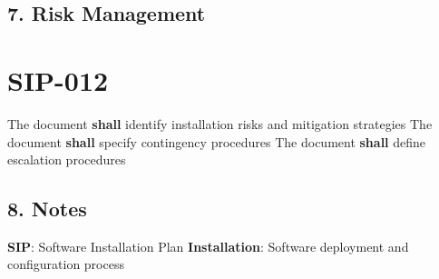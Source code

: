 \subsection{7. Risk Management}

\section{SIP-012}\label{SIP-012}

The document \textbf{shall} identify installation risks and mitigation strategies
The document \textbf{shall} specify contingency procedures
The document \textbf{shall} define escalation procedures

\subsection{8. Notes}
\textbf{SIP}: Software Installation Plan
\textbf{Installation}: Software deployment and configuration process


